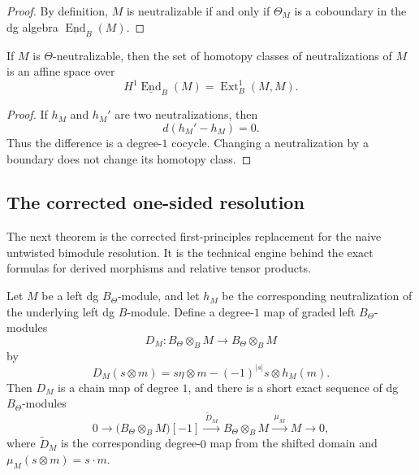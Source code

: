 \begin{proof}
By definition, \(M\) is neutralizable if and only if \(\Theta_{M}\) is a coboundary in the dg algebra \(\underline{\operatorname{End}}_{B}(M)\).
\end{proof}

\begin{corollary}
If \(M\) is \(\Theta\)-neutralizable, then the set of homotopy classes of neutralizations of \(M\) is an affine space over
\[
H^{1}\underline{\operatorname{End}}_{B}(M)
=\operatorname{Ext}^{1}_{B}(M,M).
\]
\end{corollary}

\begin{proof}
If \(h_{M}\) and \(h_{M}'\) are two neutralizations, then
\[
d(h_{M}'-h_{M})=0.
\]
Thus the difference is a degree-\(1\) cocycle.
Changing a neutralization by a boundary does not change its homotopy class.
\end{proof}

\subsection{The corrected one-sided resolution}

The next theorem is the corrected first-principles replacement for the naive untwisted bimodule resolution.
It is the technical engine behind the exact formulas for derived morphisms and relative tensor products.

\begin{theorem}
Let \(M\) be a left dg \(B_{\Theta}\)-module, and let \(h_{M}\) be the corresponding neutralization of the underlying left dg \(B\)-module.
Define a degree-\(1\) map of graded left \(B_{\Theta}\)-modules
\[
D_{M}:B_{\Theta}\otimes_{B} M\longrightarrow B_{\Theta}\otimes_{B} M
\]
by
\[
D_{M}(s\otimes m)=s\eta\otimes m-(-1)^{|s|}s\otimes h_{M}(m).
\]
Then \(D_{M}\) is a chain map of degree \(1\), and there is a short exact sequence of dg \(B_{\Theta}\)-modules
\[
0\longrightarrow \big(B_{\Theta}\otimes_{B}M\big)[-1]
\xrightarrow{\;\widetilde D_{M}\;}
B_{\Theta}\otimes_{B}M
\xrightarrow{\;\mu_{M}\;}
M
\longrightarrow 0,
\]
where \(\widetilde D_{M}\) is the corresponding degree-\(0\) map from the shifted domain and \(\mu_{M}(s\otimes m)=s\cdot m\).
\end{theorem}

